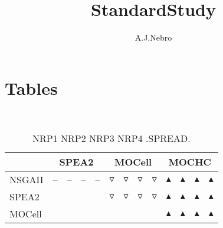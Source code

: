 \documentclass{article}
\title{StandardStudy}
\author{A.J.Nebro}
\begin{document}
\maketitle
\section{Tables}
\
\begin{table}
\caption{
NRP1 NRP2 NRP3 NRP4 
.SPREAD.}
\label{Table:
NRP1 NRP2 NRP3 NRP4 
.SPREAD.}
\centering
\begin{scriptsize}
\begin{tabular}{
| l | p{0.15cm }p{0.15cm }p{0.15cm }p{0.15cm } | p{0.15cm }p{0.15cm }p{0.15cm }p{0.15cm } | p{0.15cm }p{0.15cm }p{0.15cm }p{0.15cm } | 
}
\hline \multicolumn{1}{|c|}{} & \multicolumn{4}{c|}{SPEA2} & \multicolumn{4}{c|}{MOCell} & \multicolumn{4}{c|}{MOCHC} \\
\hline 
NSGAII
 & 
--
&
--
&
--
&
--
 & 
$\triangledown$
&
$\triangledown$
&
$\triangledown$
&
$\triangledown$
 & 
$\blacktriangle$
&
$\blacktriangle$
&
$\blacktriangle$
&
$\blacktriangle$
 \\ 
SPEA2
 & 
  
&
  
&
  
&
  
 & 
$\triangledown$
&
$\triangledown$
&
$\triangledown$
&
$\triangledown$
 & 
$\blacktriangle$
&
$\blacktriangle$
&
$\blacktriangle$
&
$\blacktriangle$
 \\ 
MOCell
 & 
 
&
 
&
 
&
 
 & 
  
&
  
&
  
&
  
 & 
$\blacktriangle$
&
$\blacktriangle$
&
$\blacktriangle$
&
$\blacktriangle$
 \\ 
\hline
\end{tabular}
\end{scriptsize}
\end{table}
\end{document}
